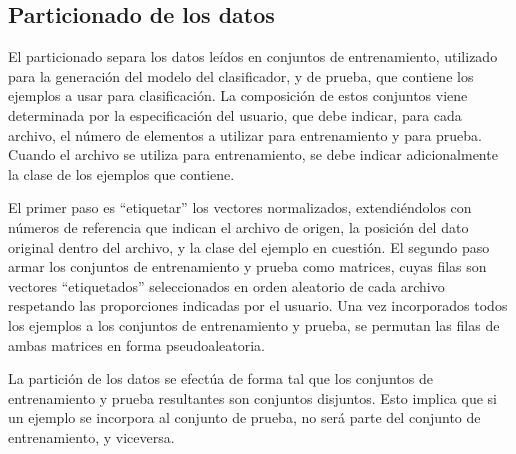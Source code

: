 %
%
%
\subsection{Particionado de los datos}
%
El particionado separa los datos leídos en conjuntos de entrenamiento,
utilizado para la generación del modelo del clasificador, y de prueba,
que contiene los ejemplos a usar para clasificación.
La composición de estos conjuntos viene determinada por la
especificación del usuario, que debe indicar, para cada archivo, el
número de elementos a utilizar para entrenamiento y para prueba.
Cuando el archivo se utiliza para entrenamiento, se debe indicar
adicionalmente la clase de los ejemplos que contiene.

El primer paso es ``etiquetar'' los vectores normalizados, extendiéndolos
con números de referencia que indican el archivo de origen, la
posición del dato original dentro del archivo, y la clase del ejemplo
en cuestión.
El segundo paso armar los conjuntos de entrenamiento y prueba como
matrices, cuyas filas son vectores ``etiquetados'' seleccionados en
orden aleatorio de cada archivo respetando las proporciones indicadas
por el usuario.
Una vez incorporados todos los ejemplos a los conjuntos de
entrenamiento y prueba, se permutan las filas de ambas matrices en
forma pseudoaleatoria.

La partición de los datos se efectúa de forma tal que los conjuntos de
entrenamiento y prueba resultantes son conjuntos disjuntos.
Esto implica que si un ejemplo se incorpora al conjunto de prueba, no
será parte del conjunto de entrenamiento, y viceversa.
